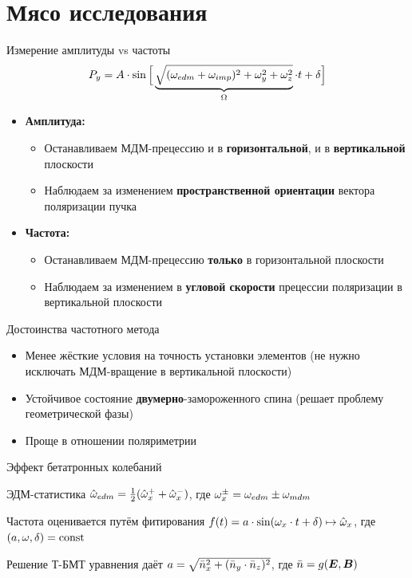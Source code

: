 \documentclass[14pt]{beamer}
\begin{document}
\section{Мясо исследования}
\begin{frame}{Измерение амплитуды vs частоты}
	\[
	P_y = A\cdot \sin\Big[\underbrace{\sqrt{(\omega_{edm} + \omega_{imp})^2 + \omega_y^2 + \omega_z^2}}_{\Omega}\cdot t + \delta\Big]
	\]
	\begin{itemize}
		\item \textbf{Амплитуда:} 
		\begin{itemize}
			\item Останавливаем МДМ-прецессию и в \textbf{горизонтальной}, и в \textbf{вертикальной} плоскости
			\item Наблюдаем за изменением \textbf{пространственной ориентации} вектора поляризации пучка
		\end{itemize}
		\item \textbf{Частота:}
		\begin{itemize}
			\item Останавливаем МДМ-прецессию \textbf{только} в горизонтальной плоскости
			\item Наблюдаем за изменением в \textbf{угловой скорости} прецессии поляризации в вертикальной плоскости
		\end{itemize}
	\end{itemize}
\end{frame}

\begin{frame}{Достоинства частотного метода}
	\begin{itemize}
		\item Менее жёсткие условия на точность установки элементов (не нужно исключать МДМ-вращение в вертикальной плоскости)
		\item Устойчивое состояние \textbf{двумерно}-замороженного спина (решает проблему геометрической фазы)
		\item Проще в отношении поляриметрии
	\end{itemize}
\end{frame}

\begin{frame}{Эффект бетатронных колебаний}
	\begin{block}{ЭДМ-статистика}
		$\hat{\omega}_{edm} = \frac12(\hat{\omega}_x^+ + \hat{\omega}_x^-)$, где $\omega_x^\pm = \omega_{edm} \pm \omega_{mdm}$
	\end{block}
	\pause
	\begin{block}{Частота оценивается путём фитирования}
		$f(t) = a\cdot\sin(\omega_x\cdot t + \delta) \mapsto \hat{\omega}_x$, где $(a,\omega, \delta) = \mathrm{const}$
	\end{block}
	\pause
	\begin{block}{Решение Т-БМТ уравнения даёт}
		$a = \sqrt{\bar n_x^2 + (\bar n_y\cdot\bar n_z)^2}$, где $\bar n = g(\boldsymbol E, \boldsymbol B)$
	\end{block}
\end{frame}
\end{document}

